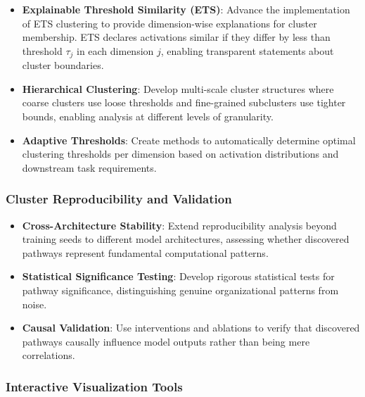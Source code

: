 \begin{itemize}
    \item \textbf{Explainable Threshold Similarity (ETS)}: Advance the implementation of ETS clustering \citep{kovalerchuk2024} to provide dimension-wise explanations for cluster membership. ETS declares activations similar if they differ by less than threshold $\tau_j$ in each dimension $j$, enabling transparent statements about cluster boundaries.
    
    \item \textbf{Hierarchical Clustering}: Develop multi-scale cluster structures where coarse clusters use loose thresholds and fine-grained subclusters use tighter bounds, enabling analysis at different levels of granularity.
    
    \item \textbf{Adaptive Thresholds}: Create methods to automatically determine optimal clustering thresholds per dimension based on activation distributions and downstream task requirements.
\end{itemize}

\subsubsection{Cluster Reproducibility and Validation}

\begin{itemize}
    \item \textbf{Cross-Architecture Stability}: Extend reproducibility analysis beyond training seeds to different model architectures, assessing whether discovered pathways represent fundamental computational patterns.
    
    \item \textbf{Statistical Significance Testing}: Develop rigorous statistical tests for pathway significance, distinguishing genuine organizational patterns from noise.
    
    \item \textbf{Causal Validation}: Use interventions and ablations to verify that discovered pathways causally influence model outputs rather than being mere correlations.
\end{itemize}

\subsubsection{Interactive Visualization Tools}

